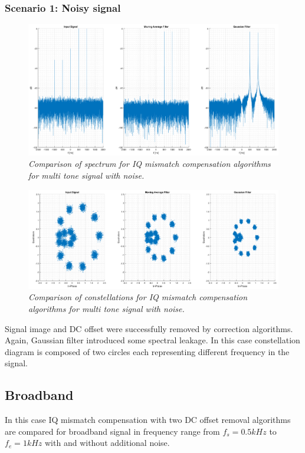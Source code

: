 \documentclass[en,printmode]{mgr}
\begin{document}
		\subsubsection*{Scenario 1: Noisy signal}
			\vspace{1cm}
			\begin{figure}[H]
    			\centering
   				\includegraphics[width=\textwidth]{plots/multi_nf.png}
   		 		\caption{\textit{Comparison of spectrum for IQ mismatch compensation algorithms for 
   		 		multi tone signal with noise.}}
   		 	\end{figure}
   		 	\vspace{2cm}	
   		 	\begin{figure}[H]
    			\centering
   				\includegraphics[width=\textwidth]{plots/multi_nc.png}
   		 		\caption{\textit{Comparison of constellations for IQ mismatch compensation algorithms 
   		 		for multi tone signal with noise.}}
   		 	\end{figure}
   		 	
   		 	Signal image and DC offset were successfully removed by correction algorithms. Again,
   		 	Gaussian filter introduced some spectral leakage. In this case constellation diagram
   		 	is composed of two circles each representing different frequency in the signal.
   		 	
   	\newpage
	\subsection*{Broadband}
		In this case IQ mismatch compensation with two DC offset removal algorithms are compared for
		broadband signal in frequency range from $f_s=0.5kHz$ to $f_e=1kHz$ with and without additional
		noise.
\end{document}
